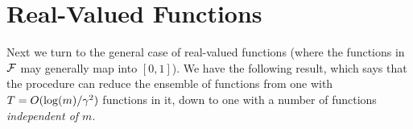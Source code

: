     


\section{Real-Valued Functions}


\label{subsubsec:real-valued-compression}

%

Next we turn to the general case of real-valued functions (where the functions in $\mathcal{F}$ may generally map into $[0,1]$).
We have the following result, which says that the  procedure can reduce the ensemble of functions 
from one with $T=O(\log(m)/\gamma^2)$ functions in it, down to one with a number of functions \emph{independent of $m$}.

